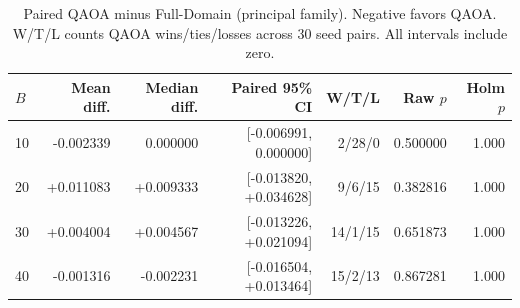 \begin{table}[htbp]\centering
\caption{Paired QAOA minus Full-Domain (principal family). Negative favors QAOA. W/T/L counts QAOA wins/ties/losses across 30 seed pairs. All intervals include zero.}\label{tab:paired}
\scriptsize
\setlength{\tabcolsep}{4pt}
\begin{tabular}{lrrrrrr}\toprule
$B$ & Mean diff. & Median diff. & Paired 95\% CI & W/T/L & Raw $p$ & Holm $p$ \\ \midrule
10 & -0.002339 & 0.000000 & [-0.006991, 0.000000] & 2/28/0 & 0.500000 & 1.000 \\
20 & +0.011083 & +0.009333 & [-0.013820, +0.034628] & 9/6/15 & 0.382816 & 1.000 \\
30 & +0.004004 & +0.004567 & [-0.013226, +0.021094] & 14/1/15 & 0.651873 & 1.000 \\
40 & -0.001316 & -0.002231 & [-0.016504, +0.013464] & 15/2/13 & 0.867281 & 1.000 \\
\bottomrule\end{tabular}
\end{table}
